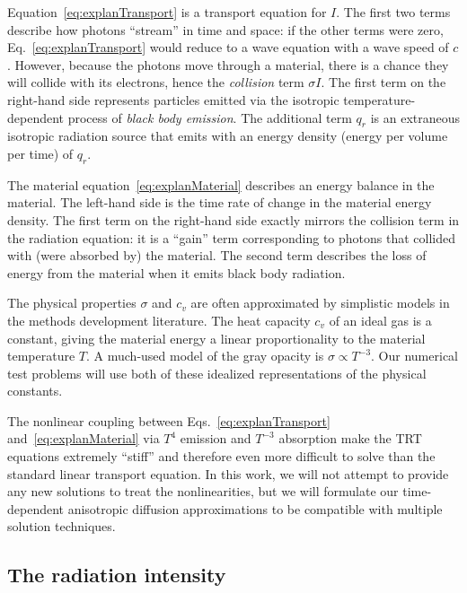 Equation~\eqref{eq:explanTransport} is a transport equation for $I$. The first
two terms describe how photons ``stream'' in time and space: if the
other terms were zero, Eq.~\eqref{eq:explanTransport} would reduce to a
wave equation with a wave speed of $c$. However, because the photons move 
through a material, there is a chance they will collide with its electrons,
hence the \emph{collision} term $\sigma I$. The first term on the right-hand
side represents particles emitted via the isotropic temperature-dependent
process of \emph{black body emission}. The additional term $q_r$ is an extraneous
isotropic radiation source that emits with an energy density (energy per
volume per time) of $q_r$.

The material equation~\eqref{eq:explanMaterial} describes an energy balance in
the material. The left-hand side is the time rate of change in the material
energy density. The first term on the right-hand side exactly mirrors the collision term in the
radiation equation: it is a ``gain'' term corresponding to photons that
collided with (were absorbed by) the material. The second term describes the loss
of energy from the material when it emits black body radiation.

The physical properties $\sigma$ and $c_v$ are often approximated by simplistic
models in the methods development literature. The heat capacity $c_v$ of an ideal
gas is a constant, giving the material energy a linear proportionality to
the material temperature $T$. A much-used model \cite{Mou2006,Wol2008} of the
gray opacity is $\sigma \propto T^{-3}$.
Our numerical test problems will use both of these idealized representations of
the physical constants.

The nonlinear coupling between Eqs.~\eqref{eq:explanTransport}
and~\eqref{eq:explanMaterial} via $T^4$ emission and $T^{-3}$ absorption make
the TRT equations extremely ``stiff'' \cite{Kno2003} and therefore even more
difficult to solve than the standard linear transport equation. In this work,
we will not attempt to provide any new solutions to treat the nonlinearities,
but we will formulate our time-dependent anisotropic diffusion approximations to
be compatible with multiple solution techniques.

\subsection{The radiation intensity}

